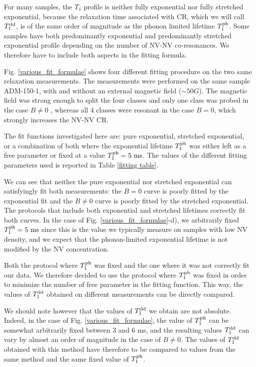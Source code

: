 \documentclass[a4paper, 11pt]{report}
\begin{document}
For many samples, the $T_1$ profile is neither fully exponential nor fully stretched exponential, because the relaxation time associated with CR, which we will call $T_1^{\rm dd}$, is of the same order of magnitude as the phonon limited lifetime $T_1^{\rm ph}$. Some samples have both predominantly exponential and predominantly stretched exponential profile depending on the number of NV-NV co-resonances. We therefore have to include both aspects in the fitting formula.

Fig. \ref{various_fit_formulae} shows four different fitting procedure on the two same relaxation measurements. The measurements were performed on the same sample ADM-150-1, with and without an external magnetic field ($\sim 50 G$). The magnetic field was strong enough to split the four classes and only one class was probed in the case $B\neq0$ , whereas all 4 classes were resonant in the case $B=0$, which strongly increases the NV-NV CR. 

The fit functions investigated here are: pure exponential, stretched exponential, or a combination of both where the exponential lifetime $T_1^{\rm ph}$ was either left as a free parameter or fixed at a value $T_1^{\rm ph}=5\ \rm ms$. The values of the different fitting parameters used is reported in Table \ref{fitting table}.

We can see that neither the pure exponential nor stretched exponential can satisfyingly fit both measurements: the $B=0$ curve is poorly fitted by the exponential fit and the $B \neq 0$ curve is poorly fitted by the stretched exponential. The protocols that include both exponential and stretched lifetimes correctly fit both curves. In the case of Fig. \ref{various_fit_formulae}-d), we arbitrarily fixed $T_1^{\rm ph}=5\ \rm ms$ since this is the value we typically measure on samples with low NV density, and we expect that the phonon-limited exponential lifetime is not modified by the NV concentration.

Both the protocol where $T_1^{\rm ph}$ was fixed and the one where it was not correctly fit our data. We therefore decided to use the protocol where $T_1^{\rm ph}$ was fixed in order to minimize the number of free parameter in the fitting function. This way, the values of $T_1^{\rm dd}$ obtained on different measurements can be directly compared. 

We should note however that the values of $T_1^{\rm dd}$ we obtain are not absolute. Indeed, in the case of Fig. \ref{various_fit_formulae}, the value of $T_1^{\rm ph}$ can be somewhat arbitrarily fixed between 3 and 6 ms, and the resulting values $T_1^{\rm dd}$ can vary by almost an order of magnitude in the case of $B\neq0$. The values of $T_1^{\rm dd}$ obtained with this method have therefore to be compared to values from the same method and the same fixed value of $T_1^{\rm ph}$.
\end{document}
